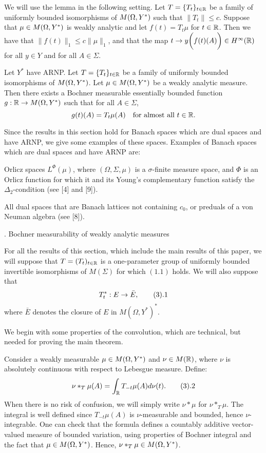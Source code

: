 \bigskip

   We will use the lemma in the following setting. Let
$T=\{T_t\}_{t\in \Bbb R}$ be
a family of uniformly bounded isomorphisms of $M(\Omega, Y^*)$ such that
$\|T_t\| \le c$.
Suppose  that $\mu\in M(\Omega, Y^*)$ is weakly analytic and let $f(t)=T_t \mu$
for $t\in \Bbb R$.
Then we have that $\| f(t)\|_1 \le c\| \mu\|_1$, and that
the map $t\to y\biggl( f(t)(A)\biggr) \in H^{\infty} (\Bbb R)$ for all
$ y\in Y$
and for all $A\in \Sigma.$

   Let $Y^*$ have ARNP.
Let $T=\{T_t\}_{t\in \Bbb R}$ be a family of uniformly bounded
isomorphisms of
$M(\Omega, Y^*)$.
Let $\mu\in M(\Omega, Y^*)$ be a weakly analytic measure. Then there exists a Bochner
measurable
essentially bounded function $g:\Bbb R \to M(\Omega, Y^*)$ such that for all $A\in
\Sigma$,
$$g(t)(A)= T_t \mu(A) \quad \text{for almost all $t\in \Bbb R$.} $$
\endproclaim

 Since the results in this section hold for
Banach spaces
which are dual spaces and have ARNP,  we give some 
examples of
these spaces.
 Examples of Banach spaces which are dual spaces and have ARNP are:
\roster
\item
Orlicz spaces $L^{\Phi}(\mu)$, where $(\Omega,\Sigma,\mu)$ is a
$\sigma$-finite measure space, and $\Phi$ is an Orlicz function
for which it and its Young's complementary function
satisfy the $\Delta_2$-condition (see [4] and [9]).
\item All dual spaces that are Banach lattices not containing  $c_0$, or
preduals of a von Neuman algebra (see [8]).
\endroster\endremark

. Bochner measurability of weakly analytic measures
\endspecialhead

For all the results of this section, which include
the main results of this paper, we will suppose that
$T=(T_t)_{ t\in \Bbb R}$ is a
one-parameter group of  uniformly bounded invertible isomorphisms of
$M(\Sigma)$ for which $(1.1)$ holds.
We will also suppose that
$$T_t^* : E\to \bar E,\tag3.1 $$
where $\bar E$ denotes the closure of $E$ in $M(\Omega,Y^*)^*$.

We begin with some properties of the convolution, which are
technical, but
needed for proving the main theorem.

        Consider  a weakly measurable  $\mu \in M(\Omega, Y^*)$ and $\nu \in
M(\Bbb R)$, where
$\nu$ is absolutely continuous with respect to Lebesgue measure.  Define:
$$ \nu \ast_T  \mu (A)= \int_{\R} T_{-t} \mu(A) d\nu(t).\tag3.2 $$
When there is no risk of confusion, we will simply write
$ \nu \ast  \mu$ for $ \nu \ast_T  \mu$.
The integral is well defined since $T_{-t} \mu (A)$ is
$\nu$-measurable and
bounded, hence $\nu$-integrable. One can check that
the formula defines a countably additive vector-valued measure of
bounded variation, using  properties of Bochner integral and the
fact that
$\mu\in M(\Omega, Y^*)$.  Hence, $\nu \ast_T  \mu \in M(\Omega, Y^*)$.

